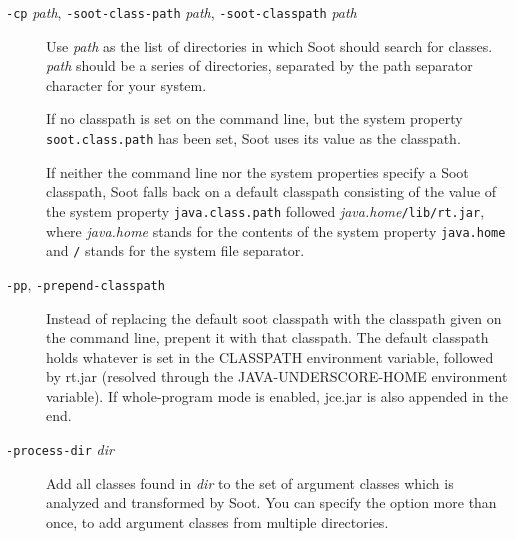 \documentclass{article}
\begin{document}
\begin{description}

  \item[
  {\tt -cp}{ \it path}, 
  {\tt -soot-class-path}{ \it path}, 
  {\tt -soot-classpath}{ \it path}]


\par

Use {\it path} as the list of directories in which Soot
should search for classes. {\it path} should be a series of
directories, separated by the path separator character for your
system.

\par

If no classpath is set on the command line, but the system
property {\tt soot.class.path} has been set, Soot uses its
value as the classpath.

\par

If neither the command line nor the system properties specify a
Soot classpath, Soot falls back on a default classpath consisting
of the value of the system property {\tt java.class.path}
followed {\it java.home}{\tt /lib/rt.jar}, where
{\it java.home} stands for the contents of the system property
{\tt java.home} and {\tt /} stands for the system file
separator.



  \item[
  {\tt -pp}, 
  {\tt -prepend-classpath}]


\par

Instead of replacing the default soot classpath with the classpath given on the command line,
prepent it with that classpath.
The default classpath holds whatever is set in the CLASSPATH environment variable,
followed by rt.jar (resolved through the JAVA-UNDERSCORE-HOME environment variable).
If whole-program mode is enabled, jce.jar is also appended in the end.




  \item[
  {\tt -process-dir}{ \it dir}]


\par

Add all classes found in {\it dir} to the set of argument classes
which is analyzed and transformed by Soot.  You can specify the
option more than once, to add argument classes from multiple directories.


\par


\end{description}
\end{document}
